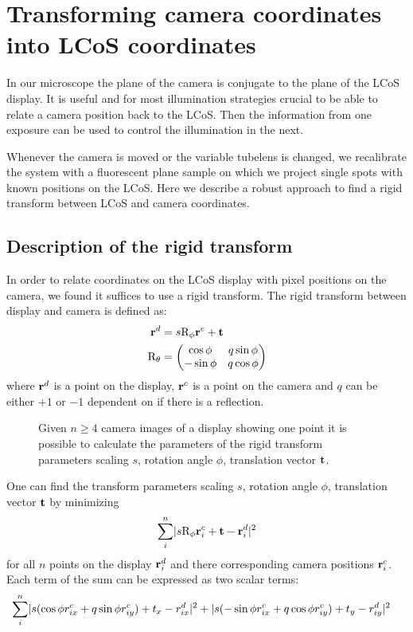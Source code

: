\chapter{Transforming camera coordinates into LCoS coordinates}
\label{sec:rigid}
\begin{summary}
  In our microscope the plane of the camera is conjugate to the plane
  of the LCoS display. It is useful and for most illumination
  strategies crucial to be able to relate a camera position back to
  the LCoS. Then the information from one exposure can be used to
  control the illumination in the next.

  Whenever the camera is moved or the variable tubelens is changed, we
  recalibrate the system with a fluorescent plane sample on which we
  project single spots with known positions on the LCoS. Here we
  describe a robust approach to find a rigid transform between LCoS
  and camera coordinates.
\end{summary}
\section{Description of the rigid transform}
In order to relate coordinates on the LCoS display with pixel
positions on the camera, we found it suffices to use a rigid
transform. The rigid transform between display and camera is defined
as:
\begin{align}
  \mathbf{r}^d&=s \textrm{R}_\phi \mathbf{r}^c + \mathbf{t}\\
  \textrm{R}_\theta&=\begin{pmatrix}
  \cos\phi & q\sin\phi \\
  -\sin\phi & q\cos\phi \\ 
  \end{pmatrix}
\end{align}
where $\mathbf{r}^d$ is a point on the display, $\mathbf{r}^c$ is a point on the
camera and $q$ can be either $+1$ or $-1$ dependent on if there is a
reflection.

\begin{figure}[!hbt]
  \centering
  
  \caption{Given $n\ge 4$ camera images of a display showing one point it
    is possible to calculate the parameters of the rigid transform
    parameters scaling $s$, rotation angle $\phi$, translation vector
    $\mathbf{t}$.}
  \label{fig:calib-align}
\end{figure}



One can find the transform parameters scaling $s$, rotation angle
$\phi$, translation vector $\mathbf{t}$ by minimizing
\begin{align}
  \sum_i^n \mathopen| s \textrm{R}_\phi \mathbf{r}^c_i+\mathbf{t} -\mathbf{r}^d_i \mathclose|^2 \label{eq:rigid-sum}
\end{align}
for all $n$ points on the display $\mathbf{r}^d_i$ and there corresponding
camera positions $\mathbf{r}^c_i$.  Each term of the sum can be expressed as
two scalar terms:
\begin{align*}
  \sum_i^n&
  \mathopen| s(\cos\phi r^c_{ix}+q\sin\phi r^c_{iy})+t_x-r^d_{ix} \mathclose|^2
  +
  \mathopen| s(-\sin\phi r^c_{ix}+q\cos\phi r^c_{iy})+t_y-r^d_{iy} \mathclose|^2
\end{align*}

